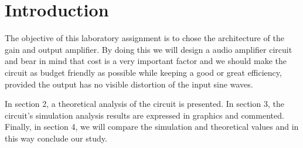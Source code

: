 \section{Introduction}
\label{sec:introduction}



The objective of this laboratory assignment is to chose the architecture of the gain and output amplifier. By doing this we will design a audio amplifier circuit and bear in mind that cost is a very important factor and we should make the circuit as budget friendly as possible while keeping a good or great efficiency, provided the output has no visible distortion of the input sine waves. 

In section 2, a theoretical analysis of the circuit is presented. In section 3, the circuit's simulation analysis results are expressed in graphics and commented. Finally, in section 4, we will compare the simulation and theoretical values and in this way conclude our study.



